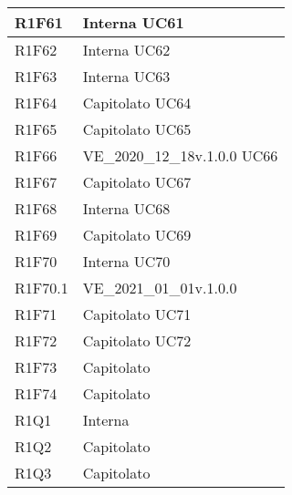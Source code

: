 \begin{center}
\begin{longtable}{|p{22mm}|p{44mm}|}
R1F61 &
Interna \newline
UC61 
\\
\hline

R1F62 &
Interna \newline
UC62 
\\
\hline

R1F63 &
Interna \newline
UC63 
\\
\hline

R1F64 &
Capitolato \newline
UC64 
\\
\hline

R1F65 &
Capitolato \newline
UC65 
\\
\hline

R1F66 &
VE\_2020\_12\_18v.1.0.0 \newline
UC66 
\\
\hline

R1F67 &
Capitolato \newline
UC67 
\\
\hline

R1F68 &
Interna \newline
UC68 
\\
\hline

R1F69 &
Capitolato \newline
UC69 
\\
\hline

R1F70 &
Interna \newline
UC70 
\\
\hline

R1F70.1 &
VE\_2021\_01\_01v.1.0.0 
\\
\hline

R1F71 &
Capitolato \newline
UC71 
\\
\hline

R1F72 &
Capitolato \newline
UC72 
\\
\hline

R1F73 &
Capitolato 
\\
\hline

R1F74 &
Capitolato 
\\
\hline

R1Q1 &
Interna 
\\
\hline

R1Q2 &
Capitolato 
\\
\hline

R1Q3 &
Capitolato 
\\
\hline


\end{longtable}
\end{center}
